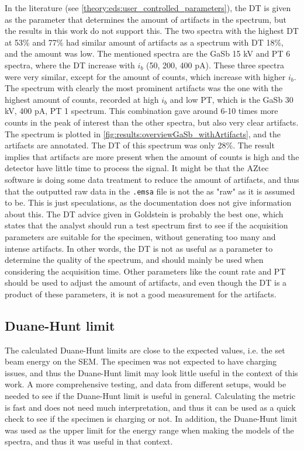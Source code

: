 In the literature (see \cref{theory:eds:user_controlled_parameters}), the DT is given as the parameter that determines the amount of artifacts in the spectrum, but the results in this work do not support this.
The two spectra with the highest DT at 53\% and 77\% had similar amount of artifacts as a spectrum with DT 18\%, and the amount was low.
The mentioned spectra are the GaSb 15 kV and PT 6 spectra, where the DT increase with $i_b$ (50, 200, 400 pA).
These three spectra were very similar, except for the amount of counts, which increase with higher $i_b$.
The spectrum with clearly the most prominent artifacts was the one with the highest amount of counts, recorded at high $i_b$ and low PT, which is the GaSb 30 kV, 400 pA, PT 1 spectrum.
This combination gave around 6-10 times more counts in the peak of interest than the other spectra, but also very clear artifacts.
The spectrum is plotted in \cref{fig:results:overviewGaSb_withArtifacts}, and the artifacts are annotated.
The DT of this spectrum was only 28\%.
The result implies that artifacts are more present when the amount of counts is high and the detector have little time to process the signal.
It might be that the AZtec software is doing some data treatment to reduce the amount of artifacts, and thus that the outputted raw data in the \verb|.emsa| file is not the as "raw" as it is assumed to be.
This is just speculations, as the documentation does not give information about this.
The DT advice given in Goldstein is probably the best one, which states that the analyst should run a test spectrum first to see if the acquisition parameters are suitable for the specimen, without generating too many and intense artifacts.
In other words, the DT is not as useful as a parameter to determine the quality of the spectrum, and should mainly be used when considering the acquisition time.
Other parameters like the count rate and PT should be used to adjust the amount of artifacts, and even though the DT is a product of these parameters, it is not a good measurement for the artifacts.



\subsection{Duane-Hunt limit}
\label{discussion:duane_hunt}

The calculated Duane-Hunt limits are close to the expected values, i.e. the set beam energy on the SEM.
The specimen was not expected to have charging issues, and thus the Duane-Hunt limit may look little useful in the context of this work.
A more comprehensive testing, and data from different setups, would be needed to see if the Duane-Hunt limit is useful in general.
Calculating the metric is fast and does not need much interpretation, and thus it can be used as a quick check to see if the specimen is charging or not.
In addition, the Duane-Hunt limit was used as the upper limit for the energy range when making the models of the spectra, and thus it was useful in that context.

